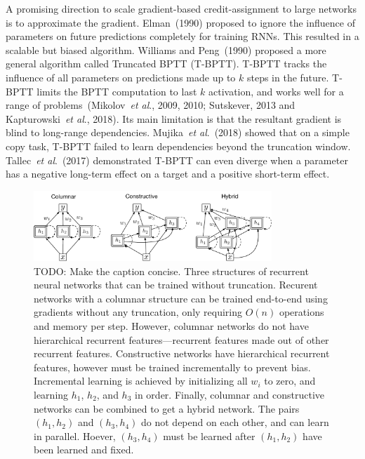 \documentclass{article}
\newcommand{\etal}{\textit{et al}.}
\begin{document}
 

A promising direction to scale gradient-based credit-assignment to large networks is to approximate the gradient. Elman~(1990) proposed to ignore the influence of parameters on future predictions completely for training RNNs. This resulted in a scalable but biased algorithm. Williams and Peng~(1990) proposed a more general algorithm called Truncated BPTT (T-BPTT). T-BPTT tracks the influence of all parameters on predictions made up to $k$ steps in the future. T-BPTT limits the BPTT computation to last $k$ activation, and works well for a range of problems~(Mikolov~\etal, 2009, 2010; Sutskever, 2013 and Kapturowski~\etal, 2018). Its main limitation is that the resultant gradient is blind to long-range dependencies. Mujika~\etal~(2018) showed that on a simple copy task, T-BPTT failed to learn dependencies beyond the truncation window. Tallec~\etal~(2017) demonstrated T-BPTT can even diverge when a parameter has a negative long-term effect on a target and a positive short-term effect. 

\begin{figure}
	\centering
	\includegraphics[width=0.8\textwidth]{figures/three_types}
	\caption{TODO: Make the caption concise. Three structures of recurrent neural networks that can be trained without truncation. Recurent networks with a columnar structure can be trained end-to-end using gradients without any truncation, only requiring $O(n)$ operations and memory per step. However, columnar networks do not have hierarchical recurrent features---recurrent features made out of other recurrent features. Constructive networks have hierarchical recurrent features, however must be trained incrementally to prevent bias. Incremental learning is achieved by initializing all $w_i$ to zero, and learning $h_1$, $h_2$, and $h_3$ in order. Finally, columnar and constructive networks can be combined to get a hybrid network. The pairs $(h_1, h_2)$ and $(h_3, h_4)$ do not depend on each other, and can learn in parallel. Hoever, $(h_3, h_4)$ must be learned after $(h_1, h_2)$ have been learned and fixed.}
\end{figure}
\end{document}
